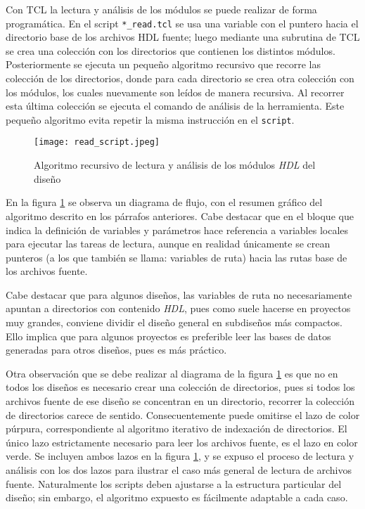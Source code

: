 Con TCL la lectura y análisis de los módulos se puede realizar de forma programática. En el script \texttt{*\_read.tcl} se usa una variable con el puntero hacia el directorio base de los archivos HDL fuente; luego mediante una subrutina de TCL se crea una colección con los directorios que contienen los distintos módulos. Posteriormente se ejecuta un pequeño algoritmo recursivo que recorre las colección de los directorios, donde para cada directorio se crea otra colección con los módulos, los cuales nuevamente son leídos de manera recursiva. Al recorrer esta última colección se ejecuta el comando de análisis de la herramienta. Este pequeño algoritmo evita repetir la misma instrucción en el \texttt{script}.

\begin{figure}[h]
\texttt{[image: read\_script.jpeg]}
\centering
\caption{Algoritmo recursivo de lectura y análisis de los módulos \textit{HDL} del diseño}
\label{s_read}
\end{figure}

En la figura \ref{s_read} se observa un diagrama de flujo, con el resumen gráfico del algoritmo descrito en los párrafos anteriores. Cabe destacar que en el bloque que indica la definición de variables y parámetros hace referencia a variables locales para ejecutar las tareas de lectura, aunque en realidad únicamente se crean punteros (a los que también se llama: variables de ruta) hacia las rutas base de los archivos fuente.

Cabe destacar que para algunos diseños, las variables de ruta no necesariamente apuntan a directorios con contenido \textit{HDL}, pues como suele hacerse en proyectos muy grandes, conviene dividir el diseño general en subdiseños más compactos. Ello implica que para algunos proyectos es preferible leer las bases de datos generadas para otros diseños, pues es más práctico.

Otra observación que se debe realizar al diagrama de la figura \ref{s_read} es que no en todos los diseños es necesario crear una colección de directorios, pues si todos los archivos fuente de ese diseño se concentran en un directorio, recorrer la colección de directorios carece de sentido. Consecuentemente puede omitirse el lazo de color púrpura, correspondiente al algoritmo iterativo de indexación de directorios. El único lazo estrictamente necesario para leer los archivos fuente, es el lazo en color verde. Se incluyen ambos lazos en la figura \ref{s_read}, y se expuso el proceso de lectura y análisis con los dos lazos para ilustrar el caso más general de lectura de archivos fuente. Naturalmente los scripts deben ajustarse a la estructura particular del diseño; sin embargo, el algoritmo expuesto es fácilmente adaptable a cada caso.

